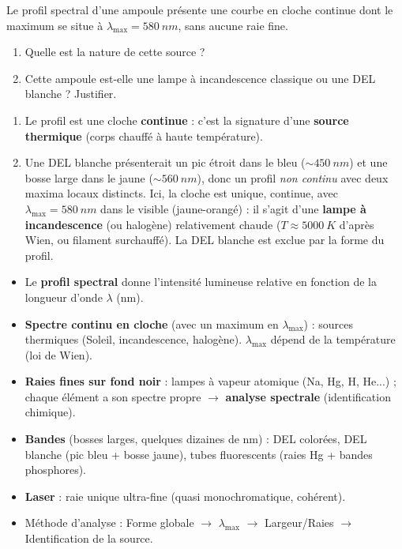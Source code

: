 \documentclass[11pt]{article}
\begin{document}
\begin{exercice}
Le profil spectral d'une ampoule présente une courbe en cloche continue dont le maximum se situe à $\lambda_{\max} = \SI{580}{nm}$, sans aucune raie fine.
\begin{enumerate}
\item Quelle est la nature de cette source ?
\item Cette ampoule est-elle une lampe à incandescence classique ou une DEL blanche ? Justifier.
\end{enumerate}
\end{exercice}

\begin{corrige}
\begin{enumerate}
\item Le profil est une cloche \textbf{continue} : c'est la signature d'une \textbf{source thermique} (corps chauffé à haute température).
\item Une DEL blanche présenterait un pic étroit dans le bleu ($\sim \SI{450}{nm}$) et une bosse large dans le jaune ($\sim \SI{560}{nm}$), donc un profil \emph{non continu} avec deux maxima locaux distincts. Ici, la cloche est unique, continue, avec $\lambda_{\max} = \SI{580}{nm}$ dans le visible (jaune-orangé) : il s'agit d'une \textbf{lampe à incandescence} (ou halogène) relativement chaude ($T \approx \SI{5000}{K}$ d'après Wien, ou filament surchauffé). La DEL blanche est exclue par la forme du profil.
\end{enumerate}
\end{corrige}

\begin{aretenir}
\begin{itemize}
\item Le \textbf{profil spectral} donne l'intensité lumineuse relative en fonction de la longueur d'onde $\lambda$ (nm).
\item \textbf{Spectre continu en cloche} (avec un maximum en $\lambda_{\max}$) : sources thermiques (Soleil, incandescence, halogène). $\lambda_{\max}$ dépend de la température (loi de Wien).
\item \textbf{Raies fines sur fond noir} : lampes à vapeur atomique (Na, Hg, H, He...) ; chaque élément a son spectre propre $\rightarrow$ \textbf{analyse spectrale} (identification chimique).
\item \textbf{Bandes} (bosses larges, quelques dizaines de nm) : DEL colorées, DEL blanche (pic bleu + bosse jaune), tubes fluorescents (raies Hg + bandes phosphores).
\item \textbf{Laser} : raie unique ultra-fine (quasi monochromatique, cohérent).
\item Méthode d'analyse : Forme globale $\rightarrow$ $\lambda_{\max}$ $\rightarrow$ Largeur/Raies $\rightarrow$ Identification de la source.
\end{itemize}
\end{aretenir}
\end{document}
